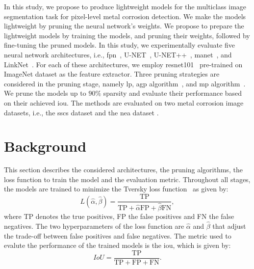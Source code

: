 \documentclass[mathematics,article,submit,pdftex,moreauthors]{Definitions/mdpi}
\begin{document}
In this study, we propose to produce lightweight
models for the multiclass image segmentation
task for pixel-level metal corrosion detection.
We make the models lightweight by pruning the neural 
network's weights. We propose to prepare the lightweight models
by training the models, and pruning their weights, followed
by fine-tuning the pruned models. 
In this study,
we experimentally evaluate five neural network
architectures, i.e., \ac{fpn}~\cite{Lin2017}, U-NET~\cite{Ronneberger2015},
U-NET++~\cite{Zhou2018}, \ac{manet}~\cite{Fan2020}, and 
LinkNet~\cite{Chaurasia2017}. For each of these architectures,
we employ \ac{resnet101}~\cite{He2016} pre-trained on ImageNet
dataset as the feature extractor. Three pruning strategies
are considered in the pruning stage, namely
\ac{lp}, \ac{agp} algorithm~\cite{Han2017},
and \ac{mp} algorithm~\cite{Sanh2020}. We prune
the models up to $90\%$ sparsity and 
evaluate their performance based on their
achieved \ac{iou}. The methods
are evaluated on two metal corrosion image datasets,
i.e., the \ac{sscs} dataset \cite{Bianchi2021Dataset,Bianchi2022Journal} and 
the \ac{nea} dataset \cite{Liu2023}. 

\section{Background}
This section describes the considered architectures,
the pruning algorithms, the loss function
to train the model and the evaluation metric.
Throughout all stages, the models are trained to minimize
the Tversky loss function~\cite{Salehi2017} as given
by:
\begin{equation}
    L(\hat{\alpha}, \hat{\beta}) = \frac{\text{TP}}{\text{TP}+
    \hat{\alpha}\text{FP} +  \hat{\beta}\text{FN}},
\end{equation}
where TP denotes the true positives, FP the false positives
and FN the false negatives. The two hyperparameters of 
the loss function are $\hat{\alpha}$ and $\hat{\beta}$
that adjust the trade-off between false positives and
false negatives. The metric used to evalute the performance of the trained
models is the \ac{iou}, which is given by:
\begin{equation}
    IoU = \frac{\text{TP}}{\text{TP}+\text{FP}+\text{FN}}.
\end{equation}
\end{document}
